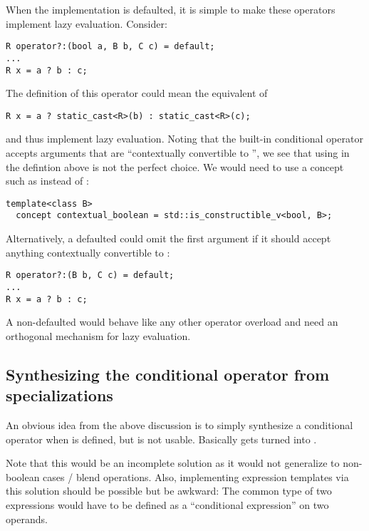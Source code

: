 When the implementation is defaulted, it is simple to make these operators implement lazy evaluation.
Consider:
\smallskip\begin{lstlisting}[style=Vc]
R operator?:(bool a, B b, C c) = default;
...
R x = a ? b : c;
\end{lstlisting}
The definition of this operator could mean the equivalent of
\smallskip\begin{lstlisting}[style=Vc]
R x = a ? static_cast<R>(b) : static_cast<R>(c);
\end{lstlisting}
and thus implement lazy evaluation.
Noting that the built-in conditional operator accepts arguments that are “contextually convertible to \bool”, we see that using \bool in the  defintion above is not the perfect choice.
We would need to use a concept such as instead of \bool:
\smallskip\begin{lstlisting}[style=Vc]
template<class B>
  concept contextual_boolean = std::is_constructible_v<bool, B>;
\end{lstlisting}
Alternatively, a defaulted  could omit the first argument if it should accept anything contextually convertible to \bool:
\smallskip\begin{lstlisting}[style=Vc]
R operator?:(B b, C c) = default;
...
R x = a ? b : c;
\end{lstlisting}

A non-defaulted  would behave like any other operator overload and need an orthogonal mechanism for lazy evaluation.

\subsection{Synthesizing the conditional operator from  specializations}
An obvious idea from the above discussion is to simply synthesize a conditional operator when  is defined, but  is not usable.
Basically  gets turned into .

Note that this would be an incomplete solution as it would not generalize to non-boolean cases / blend operations.
Also, implementing expression templates via this solution should be possible but be awkward:
The common type of two expressions would have to be defined as a “conditional expression” on two operands.


